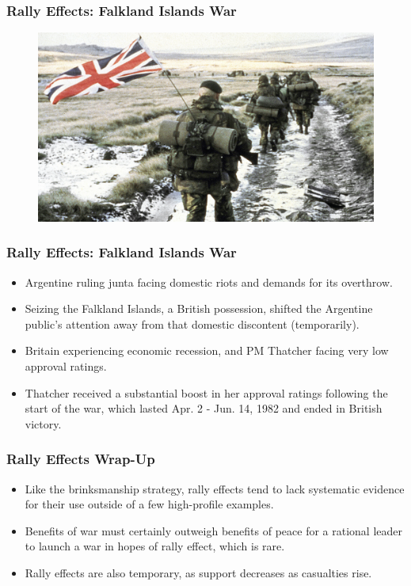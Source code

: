 \documentclass[handout]{beamer}
\begin{document}
\begin{frame} 
	\frametitle{\LARGE{Rally Effects: Falkland Islands War}}
	\begin{figure}[ht!]
		\centering
		\includegraphics[width=\textwidth,height=0.9\textheight,keepaspectratio]{Britishtroops.jpg}
	\end{figure}
\end{frame}

\begin{frame} 
	\frametitle{\LARGE{Rally Effects: Falkland Islands War}}
	\begin{itemize}
		\item Argentine ruling junta facing domestic riots and demands for its overthrow. \pause
		\item Seizing the Falkland Islands, a British possession, shifted the Argentine public's attention away from that domestic discontent (temporarily). \pause
		\item Britain experiencing economic recession, and PM Thatcher facing very low approval ratings. \pause
		\item Thatcher received a substantial boost in her approval ratings following the start of the war, which lasted Apr. 2 - Jun. 14, 1982 and ended in British victory.
	\end{itemize}
\end{frame}

\begin{frame} 
	\frametitle{\LARGE{Rally Effects Wrap-Up}}
	\begin{itemize}
		\item Like the brinksmanship strategy, rally effects tend to lack systematic evidence for their use outside of a few high-profile examples. \pause
		\item Benefits of war must certainly outweigh benefits of peace for a rational leader to launch a war in hopes of rally effect, which is rare. \pause
		\item Rally effects are also temporary, as support decreases as casualties rise.
	\end{itemize}
\end{frame}
\end{document}
